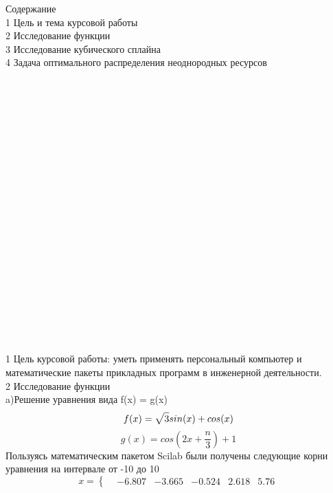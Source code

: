 \documentclass[russian,utf8,nocolumnxxxi,nocolumnxxxii]{eskdtext}
\begin{document}
\maketitle
Содержание\\

1 Цель и тема курсовой работы\\

2 Исследование функции\\

3 Исследование кубического сплайна\\

4 Задача оптимального распределения неоднородных ресурсов\\
\\
\\
\\
\\
\\
\\
\\
\\
\\
\\
\\
\\
\\
\\
\\
\\
\\
\\
\\
\\
\\
1 Цель курсовой работы: уметь применять персональный компьютер и
математические пакеты прикладных программ в инженерной деятельности.\\
2 Исследование функции\\
a)Решение уравнения вида f(x) = g(x)\\
\begin{equation}
f(x)= \sqrt{3\mathstrut}sin(x) + cos(x)
\end{equation}
\begin{equation}
g(x)=cos\left(2x+\frac n{3} \right)+1
\end{equation}
Пользуясь математическим пакетом Scilab были получены следующие корни уравнения на интервале от -10 до 10\\
\begin{equation}
x=\left\{
\begin{array}{c}
    &-6.807
    &-3.665
    &-0.524
    &2.618
    &5.76
    \end{array}
\right.
\end{equation}
\end{document}
